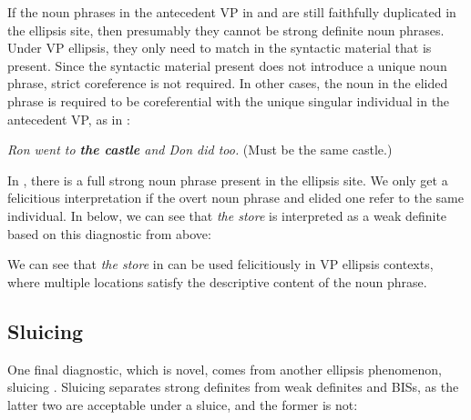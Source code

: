 \documentclass[output=paper,
modfonts
]{langscibook}
\begin{document}
If the noun phrases in the antecedent VP in  and  are still faithfully duplicated in the ellipsis site, then presumably they cannot be strong definite noun phrases. Under VP ellipsis, they only need to match in the syntactic material that is present. Since the syntactic material present does not introduce a unique noun phrase, strict coreference is not required. In other cases, the noun in the elided phrase is required to be coreferential with the unique singular individual in the antecedent VP, as in :

\begin{exe}
	\ex \label{ex:williams:14}
		\textit{Ron went to \textbf{the castle} and Don did too.}   
		\leavevmode 
		(Must be the same castle.) 
\end{exe}

In , there is a full strong noun phrase present in the ellipsis site. We only get a felicitious interpretation if the overt noun phrase and elided one refer to the same individual. In  below, we can see that \textit{the store} is interpreted as a weak definite based on this diagnostic from above: 

\begin{exe}
\end{exe}

We can see that \textit{the store} in  can be used felicitiously in VP ellipsis contexts, where multiple locations satisfy the descriptive content of the noun phrase.

\subsection{Sluicing}\label{sec:williams:2.3}

One final diagnostic, which is novel, comes from another ellipsis phenomenon, sluicing \citep{ross1967,ross1969}. Sluicing separates strong definites from weak definites and BISs, as the latter two are acceptable under a sluice, and the former is not:

\begin{exe}
\end{exe}
\end{document}
